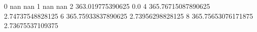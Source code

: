 0 nan nan
1 nan nan
2 363.019775390625 0.0
4 365.76715087890625 2.74737548828125
6 365.75933837890625 2.73956298828125
8 365.75653076171875 2.73675537109375
